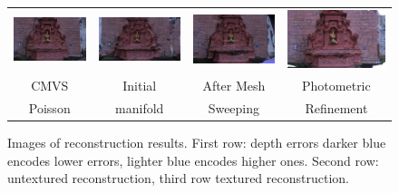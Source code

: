 \begin{figure}[t]
\begin{tabular}{cccc}
\includegraphics[width=0.22\columnwidth]{./img/poissonTex}&
\includegraphics[width=0.22\columnwidth]{./img/first_tex}&
\includegraphics[width=0.22\columnwidth]{./img/myresTex}&
\includegraphics[width=0.22\columnwidth]{./img/photo_mesh_rgb_crop}\\
CMVS &
Initial&
After Mesh&
Photometric\\
Poisson &
manifold&
 Sweeping&
Refinement\\
\end{tabular}
\caption{Images of reconstruction results. First row: depth errors darker blue encodes lower errors, lighter blue encodes higher ones. Second row: untextured reconstruction, third row textured reconstruction.}
\label{fig:fountainIm}
\end{figure}



